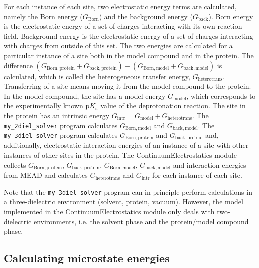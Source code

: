 \documentclass[a4paper,11pt]{article}
\newcommand{\modulename}{ContinuumElectrostatics\xspace}
\newcommand{\pka}{$\mathrm{p}K_{\mathrm{a}}$\xspace}
\begin{document}
{For each instance of each site, two electrostatic energy terms are calculated, namely
the Born energy ($G_{\mathrm{Born}}$) and the background energy ($G_{\mathrm{back}}$).
%
Born energy is the electrostatic energy of a set of charges interacting with its own
reaction field.
%
Background energy is the electrostatic energy of a set of charges interacting with
charges from outside of this set.
%
The two energies are calculated for a particular instance of a site both in the model compound
and in the protein.
%
The difference
$(G_{\mathrm{Born, protein}} + G_{\mathrm{back, protein}}) - (G_{\mathrm{Born, model}} + G_{\mathrm{back, model}})$
is calculated, which is called the heterogeneous transfer energy, $G_{\mathrm{heterotrans}}$.
%
Transferring of a site means moving it from the model compound to the protein.
%
In the model compound, the site has a model energy $G_{\mathrm{model}}$, which
corresponds to the experimentally known \pka value of the deprotonation reaction.
%
The site in the protein has an intrinsic energy $G_{\mathrm{intr}} = G_{\mathrm{model}} + G_{\mathrm{heterotrans}}$.
%
The \texttt{my\_2diel\_solver} program calculates $G_{\mathrm{Born, model}}$ and $G_{\mathrm{back, model}}$.
%
The \texttt{my\_3diel\_solver} program calculates $G_{\mathrm{Born, protein}}$ and $G_{\mathrm{back, protein}}$
and, additionally, electrostatic interaction energies of an instance of a site
with other instances of other sites in the protein.
%
The \modulename module collects 
$G_{\mathrm{Born, protein}}$, $G_{\mathrm{back, protein}}$, 
$G_{\mathrm{Born, model}}$, $G_{\mathrm{back, model}}$ and interaction energies from MEAD 
and calculates $G_{\mathrm{heterotrans}}$ and $G_{\mathrm{intr}}$ for each instance of each site.

Note that the \texttt{my\_3diel\_solver} program can in principle perform calculations
in a three-dielectric environment (solvent, protein, vacuum).
%
However, the model implemented in the \modulename module only deals with two-dielectric environments, 
i.e. the solvent phase and the protein/model compound phase.


\subsection{Calculating microstate energies}

}
\end{document}
